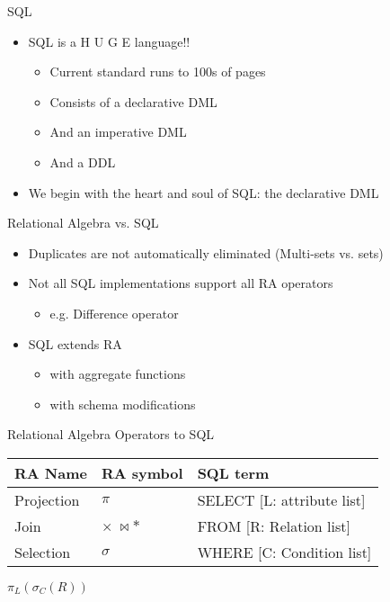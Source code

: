 \documentclass[aspectratio=169]{beamer}
\newenvironment{noindentitemize}
{ \begin{itemize}
 \setlength{\itemsep}{1.5ex}
  \setlength{\parsep}{0pt}   
  \setlength{\parskip}{0pt}
 \addtolength{\leftskip}{-2em}
 }
{ \end{itemize} }
\newenvironment{noindentitemize2}
{ \begin{itemize}
  \setlength{\itemsep}{0ex}
  \setlength{\parskip}{0pt}
  \setlength{\parsep}{0pt}   
  \addtolength{\leftskip}{-2em}  }
{ \end{itemize} }
\begin{document}
\begin{frame}{SQL}

\begin{noindentitemize}
\item SQL is a H U G E language!!
	\begin{noindentitemize2}
	\item Current standard runs to 100s of pages
	\item Consists of a declarative DML
	\item And an imperative DML
	\item And a DDL
	\end{noindentitemize2}
\item We begin with the heart and soul of SQL: the declarative DML
\end{noindentitemize}
\end{frame}
\begin{frame}{Relational Algebra vs. SQL}

\begin{itemize}
\item Duplicates are not automatically eliminated (Multi-sets vs. sets)
\item Not all SQL implementations support all RA operators
\begin{itemize}
\item e.g. Difference operator
\end{itemize}
\item SQL extends RA
\begin{itemize}
\item with aggregate functions
\item with schema modifications
\end{itemize}
\end{itemize}

\end{frame}
\begin{frame}{Relational Algebra Operators to SQL}

\begin{tabular}{|l|l|l|} \hline
RA Name & RA symbol & SQL term \\ \hline
Projection & $\pi$ & SELECT [L: attribute list] \\\hline
Join & $\times \ \bowtie *$ & FROM [R: Relation list] \\ \hline
Selection & $\sigma$ & WHERE [C: Condition list] \\ \hline
\end{tabular}


\vspace{2em}
{\Large 
 $\pi_L(\sigma_C(R))$}
\end{frame}
\end{document}
